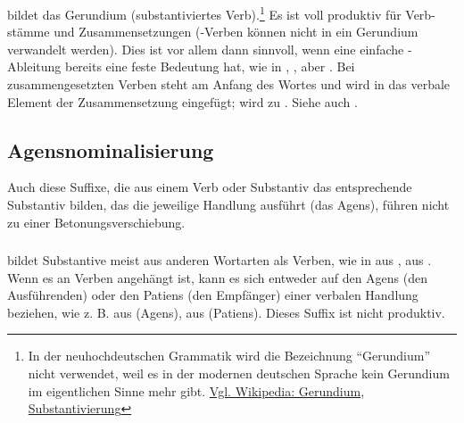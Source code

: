 \subsubsection{}  bildet das Gerundium (substantiviertes Verb).\footnote{In der neuhochdeutschen Grammatik wird die Bezeichnung ``Gerundium'' nicht verwendet, weil es in der modernen deutschen Sprache kein Gerundium im eigentlichen Sinne mehr gibt. \href{https://de.wikipedia.org/wiki/Gerundium}{Vgl. Wikipedia: Gerundium}, \href{https://de.wikipedia.org/wiki/Substantivierung}{Substantivierung}} Es ist voll produktiv für Verb-stämme und Zusammensetzungen (-Verben  können nicht in ein Gerundium verwandelt werden). Dies ist vor allem dann sinnvoll, wenn eine einfache -Ableitung bereits eine feste Bedeutung hat, wie in  ,  , aber  . Bei zusammengesetzten Verben steht  am Anfang des Wortes und  wird in das verbale Element der Zusammensetzung eingefügt;  wird zu . Siehe auch
.
\label{lingop:gerund}

\subsection{Agensnominalisierung} Auch diese Suffixe, die aus einem Verb oder Substantiv das entsprechende Substantiv bilden, das die jeweilige Handlung ausführt (das Agens), führen nicht zu einer Betonungsverschiebung.

\subsubsection{} 
 bildet Substantive meist aus anderen Wortarten als Verben, wie in   aus  ,   aus  . Wenn es an Verben angehängt ist, kann es sich entweder auf den Agens (den Ausführenden) oder den Patiens (den Empfänger) einer verbalen Handlung beziehen, wie z. B.   aus   (Agens),   aus   (Patiens). Dieses Suffix ist nicht produktiv.

